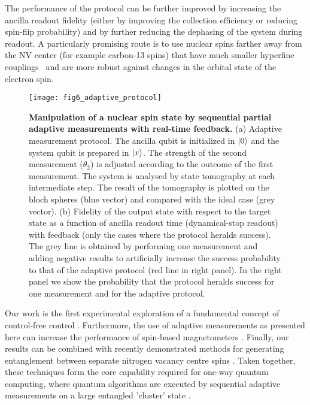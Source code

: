 The performance of the protocol can be further improved by increasing the ancilla readout fidelity (either by improving the collection efficiency or reducing spin-flip probability) and by further reducing the dephasing of the system during readout. A particularly promising route is to use nuclear spins farther away from the NV center (for example carbon-13 spins) that have much smaller hyperfine couplings~\cite{Zhao_NatureNano_2012,Taminiau_PRL_2012,Kolkowitz_PRL_2012} and are more robust against changes in the orbital state of the electron spin.

\begin{figure*}
	\centering
	\texttt{[image: fig6\_adaptive\_protocol]}
	\caption{\label{fig:amc-fig6} \textbf{Manipulation of a nuclear spin state by sequential partial adaptive measurements with real-time feedback.} (a) Adaptive measurement protocol. The ancilla qubit is initialized in $\left|0\right>$ and the system qubit is prepared in $\left|x\right>$. The strength of the second measurement ($\theta_2$) is adjusted according to the outcome of the first measurement. The system is analysed by state tomography at each intermediate step. The result of the tomography is plotted on the bloch spheres (blue vector) and compared with the ideal case (grey vector). (b) Fidelity of the output state with respect to the target state as a function of ancilla readout time (dynamical-stop readout) with feedback (only the cases where the protocol heralds success). The grey line is obtained by performing one measurement and adding negative results to artificially increase the success probability to that of the adaptive protocol (red line in right panel). In the right panel we show the probability that the protocol heralds success for one measurement and for the adaptive protocol.  }
\end{figure*}

Our work is the first experimental exploration of a fundamental concept of control-free control \cite{Jordan_PRB_2006, Ashhab_PhysRevA_2010, Wiseman_NatureNV_2011} . Furthermore, the use of adaptive measurements as presented here can increase the performance of spin-based magnetometers \cite{Cappellaro_PhysRevA_2012, Higgins_Nature_2007}. Finally, our results can be combined with recently demonstrated methods for generating entanglement between separate nitrogen vacancy centre spins \cite{Bernien_Nature_2013, Dolde_NatPhys_2013}. Taken together, these techniques form the core capability required for one-way quantum computing, where quantum algorithms are executed by sequential adaptive measurements on a large entangled 'cluster' state \cite{Raussendorf_PRL_2001, Prevedel_Nature_2007}.

